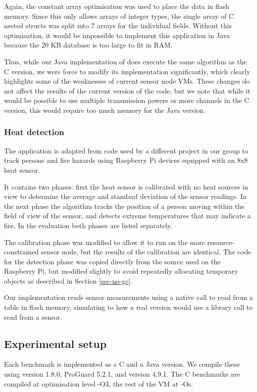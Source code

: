 Again, the constant array optimisation was used to place the data in flash memory. Since this only allows arrays of integer types, the single array of C nested structs was split into 7 arrays for the individual fields. Without this optimisation, it would be impossible to implement this application in Java because the 20 KB database is too large to fit in RAM.

Thus, while our Java implementation of  does execute the same algorithm as the C version, we were force to modify its implementation significantly, which clearly highlights some of the weaknesses of current sensor node VMs. These changes do not affect the results of the current version of the code, but we note that while it would be possible to use multiple transmission powers or more channels in the C version, this would require too much memory for the Java version.

\subsubsection{Heat detection}
The  application is adapted from code used by a different project in our group to track persons and fire hazards using Raspberry Pi devices equipped with an 8x8 heat sensor.

It contains two phases: first the heat sensor is calibrated with no heat sources in view to determine the average and standard deviation of the sensor readings. In the next phase the algorithm tracks the position of a person moving within the field of view of the sensor, and detects extreme temperatures that may indicate a fire. In the evaluation both phases are listed separately.

The calibration phase was modified to allow it to run on the more resource-constrained sensor node, but the results of the calibration are identical. The code for the detection phase was copied directly from the source used on the Raspberry Pi, but modified slightly to avoid repeatedly allocating temporary objects as described in Section \ref{sec-no-gc}.

Our implementation reads sensor measurements using a native call to read from a table in flash memory, simulating to how a real version would use a library call to read from a sensor.


\subsection{Experimental setup}
Each benchmark is implemented as a C and a Java version. We compile these using  version 1.8.0, ProGuard 5.2.1, and  version 4.9.1. The C benchmarks are compiled at optimisation level -O3, the rest of the VM at -Os.

